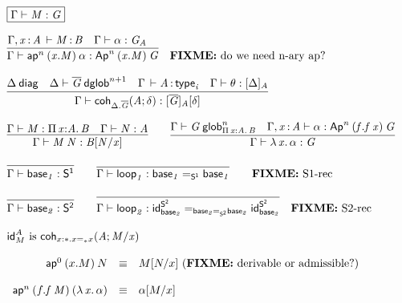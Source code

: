 \begin{small}
\[
\begin{array}{l}
\framebox{\ofglob{\Gamma}{M}{G}} \\ \\

\infer{\ofglob{\Gamma}{\apn{n}{(x.M)}{\alpha}}{\Apn{n}{(x.M)}{G}}}
      {\oftp{\Gamma,\tptm{x}{A}}{M}{B} &
       \ofglob{\Gamma}{\alpha}{G_A} &
      }
\quad
\text{\FIXME{do we need n-ary ap?}}
\\ \\

\infer{\ofglob{\Gamma}{\coh{\ctx{\Delta}.\diag{G}}{A}{\delta}}{\tsubst{\interpdiag{\diag{G}}{A}}{\delta}}}
      {\wfdiag{\Delta} &
       \wfdglob{\Delta}{\diag G}{n+1} &
       \oftp{\Gamma}{A}{\typ{i}} &
       \wfsub{\Gamma}{\theta}{\interpdiag{\Delta}{A}}
      }
\\ \\

\infer{\ofglob{\Gamma}{\app{M}{N}}{\subst{B}{N}{x}}}
      {\ofglob{\Gamma}{M}{\picl{x}{A}{B}} &
        \ofglob{\Gamma}{N}{A}}
\qquad
\infer{\ofglob{\Gamma}{\ulam{x}{\alpha}}{G}}
      {\wfglob{\Gamma}{G}{n}{\picl{x}{A}{B}} &
       \ofglob{\Gamma,\tptm{x}{A}}{\alpha}{\Apn{n}{(f.\app{f}{x})}{G}}}
\\ \\

\infer{\ofglob{\Gamma}{\base{1}}{\dsd{S^1}}}{}
\qquad
\infer{\ofglob{\Gamma}{\lp{1}}{\homj{\dsd{S^1}}{\base{1}}{\base{1}}}}
      {}
\qquad
\text{\FIXME{S1-rec}}
\\ \\
\infer{\ofglob{\Gamma}{\base{2}}{\dsd{S^2}}}{}
\qquad
\infer{\ofglob{\Gamma}{\lp{2}}{\homj{\homj{\dsd{S^2}}{\base{2}}{\base{2}}}{\idt{\dsd{S^2}}{\base{2}}}{\idt{\dsd{S^2}}{\base{2}}}}}
      {} 
\quad
\text{\FIXME{S2-rec}}
\\ \\
\text{\idt{A}{M} is \coh{x:\diagbase.\homj{\diagbase}{x}{x}}{A}{M/x}} 

\\ \\
\begin{array}{rcl}
\apn{0}{(x.M)}{N} & \equiv & \subst{M}{N}{x} \text{ (\FIXME{derivable or admissible?})} \\ \\

\apn{n}{(f.\app f M)}{(\ulam{x}{\alpha})} & \equiv & \tsubst{\alpha}{M/x} \\


\end{array}
\end{array}\]
\end{small}
